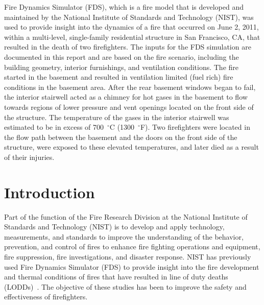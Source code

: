 \documentclass[12pt,oneside]{book}
\begin{document}
Fire Dynamics Simulator (FDS), which is a fire model that is developed and maintained by the National Institute of Standards and Technology (NIST), was used to provide insight into the dynamics of a fire that occurred on June 2, 2011, within a multi-level, single-family residential structure in San Francisco, CA, that resulted in the death of two firefighters. The inputs for the FDS simulation are documented in this report and are based on the fire scenario, including the building geometry, interior furnishings, and ventilation conditions. The fire started in the basement and resulted in ventilation limited (fuel rich) fire conditions in the basement area. After the rear basement windows began to fail, the interior stairwell acted as a chimney for hot gases in the basement to flow towards regions of lower pressure and vent openings located on the front side of the structure. The temperature of the gases in the interior stairwell was estimated to be in excess of 700~$^{\circ}$C (1300~$^{\circ}$F). Two firefighters were located in the flow path between the basement and the doors on the front side of the structure, were exposed to these elevated temperatures, and later died as a result of their injuries.


\chapter{Introduction}
\label{sec:introduction}
\setcounter{page}{1}

Part of the function of the Fire Research Division at the National Institute of Standards and Technology (NIST) is to develop and apply technology, measurements, and standards to improve the understanding of the behavior, prevention, and control of fires to enhance fire fighting operations and equipment, fire suppression, fire investigations, and disaster response. NIST has previously used Fire Dynamics Simulator (FDS) to provide insight into the fire development and thermal conditions of fires that have resulted in line of duty deaths (LODDs)~\cite{Madrzykowski:1,Iowa,Texas,Bryner:Charleston,barowy:texas,Weinschenk:Chicago}. The objective of these studies has been to improve the safety and effectiveness of firefighters.
\end{document}
